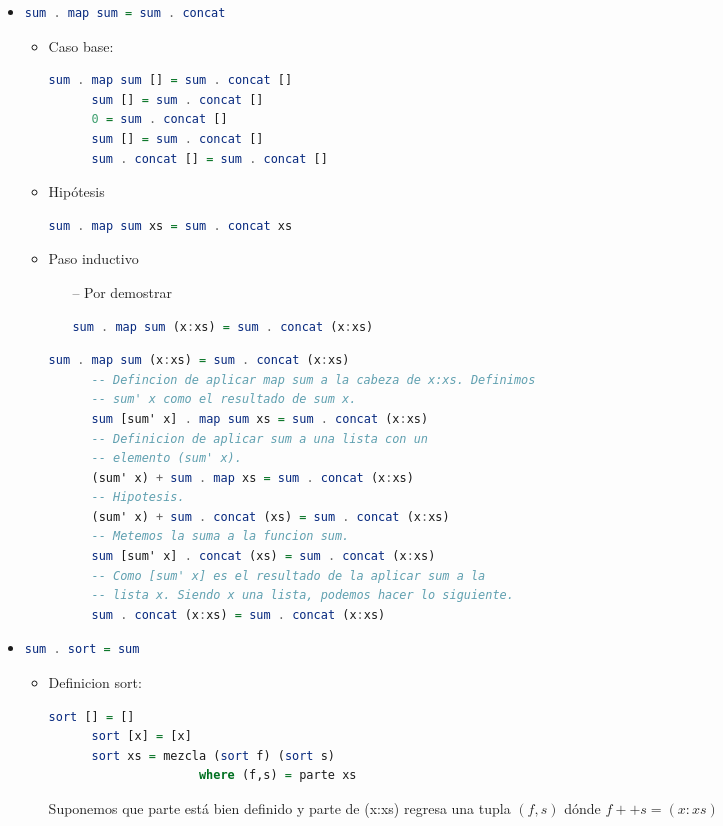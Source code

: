 \documentclass[spanish,12pt,letterpaper]{article}
\begin{document}
\begin{itemize}
\item
  \begin{lstlisting}[language=Haskell]
    sum . map sum = sum . concat
  \end{lstlisting}
  \begin{itemize}
    \item Caso base:
    \begin{lstlisting}[language=Haskell]
      sum . map sum [] = sum . concat []
      sum [] = sum . concat []
      0 = sum . concat []
      sum [] = sum . concat []
      sum . concat [] = sum . concat []
    \end{lstlisting}
  \item Hipótesis
    \begin{lstlisting}[language=Haskell]
      sum . map sum xs = sum . concat xs
    \end{lstlisting}
  \item Paso inductivo
    \begin{itemize}
    \item [--] Por demostrar
      \begin{lstlisting}[language=Haskell]
        sum . map sum (x:xs) = sum . concat (x:xs)
      \end{lstlisting}
    \end{itemize}
    \begin{lstlisting}[language=Haskell]
      sum . map sum (x:xs) = sum . concat (x:xs)
      -- Defincion de aplicar map sum a la cabeza de x:xs. Definimos
      -- sum' x como el resultado de sum x.
      sum [sum' x] . map sum xs = sum . concat (x:xs)
      -- Definicion de aplicar sum a una lista con un
      -- elemento (sum' x).
      (sum' x) + sum . map xs = sum . concat (x:xs)
      -- Hipotesis.
      (sum' x) + sum . concat (xs) = sum . concat (x:xs)
      -- Metemos la suma a la funcion sum.
      sum [sum' x] . concat (xs) = sum . concat (x:xs)
      -- Como [sum' x] es el resultado de la aplicar sum a la
      -- lista x. Siendo x una lista, podemos hacer lo siguiente.
      sum . concat (x:xs) = sum . concat (x:xs)
    \end{lstlisting}
  \end{itemize}

\item
  \begin{lstlisting}[language=Haskell]
    sum . sort = sum
  \end{lstlisting}
  \begin{itemize}
  	\item Definicion sort:
  	\begin{lstlisting}[language=Haskell]
	  sort [] = []
	  sort [x] = [x]
	  sort xs = mezcla (sort f) (sort s)
	                 where (f,s) = parte xs
    \end{lstlisting}
    Suponemos que parte está bien definido y parte de (x:xs) regresa una
    tupla $(f,s)$ dónde $f ++ s = (x:xs) $


\end{itemize}
\end{itemize}
\end{document}
